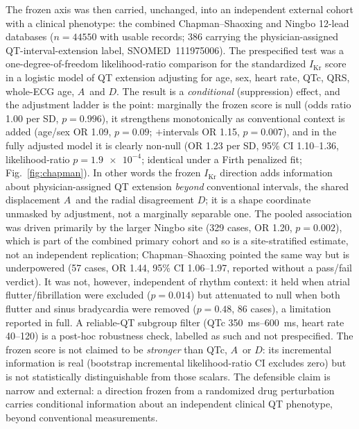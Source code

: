 \documentclass[11pt]{article}
\newcommand{\D}{\ensuremath{D}}
\newcommand{\A}{\ensuremath{A}}
\begin{document}
The frozen axis was then carried, unchanged, into an independent external cohort with a
clinical phenotype: the combined Chapman--Shaoxing and Ningbo 12-lead databases
($n=\num{44550}$ with usable records; \num{386} carrying the physician-assigned
QT-interval-extension label, SNOMED~111975006). The prespecified test was a
one-degree-of-freedom likelihood-ratio comparison for the standardized $I_{\text{Kr}}$ score
in a logistic model of QT extension adjusting for age, sex, heart rate, QTc, QRS, whole-ECG
age, \A\ and \D. The result is a \emph{conditional} (suppression) effect, and the adjustment
ladder is the point: marginally the frozen score is null (odds ratio \num{1.00} per SD,
$p=\num{0.996}$), it strengthens monotonically as conventional context is added
(age/sex OR \num{1.09}, $p=\num{0.09}$; $+$intervals OR \num{1.15}, $p=\num{0.007}$), and in
the fully adjusted model it is clearly non-null (OR \num{1.23} per SD, 95\% CI
\numrange{1.10}{1.36}, likelihood-ratio $p=\num{1.9e-4}$; identical under a Firth
penalized fit; Fig.~\ref{fig:chapman}). In other words the frozen $I_{\text{Kr}}$ direction adds information about
physician-assigned QT extension \emph{beyond} conventional intervals, the shared displacement
\A\ and the radial disagreement \D; it is a shape coordinate unmasked by adjustment, not a
marginally separable one. The pooled association was driven primarily by the larger Ningbo site
(\num{329} cases, OR \num{1.20}, $p=\num{0.002}$), which is part of the combined primary cohort and
so is a site-stratified estimate, not an independent replication; Chapman--Shaoxing pointed the same way but
is underpowered (\num{57} cases, OR \num{1.44}, 95\% CI \numrange{1.06}{1.97}, reported without
a pass/fail verdict). It was not, however, independent of rhythm context: it held when atrial
flutter/fibrillation were excluded ($p=\num{0.014}$) but attenuated to null when both flutter
and sinus bradycardia were removed ($p=\num{0.48}$, \num{86} cases), a limitation reported in
full. A reliable-QT subgroup filter (QTc \SIrange{350}{600}{\milli\second}, heart rate
\SIrange{40}{120}{}) is a post-hoc robustness check, labelled as such and not
prespecified. The frozen score is not claimed to be \emph{stronger} than QTc, \A\ or \D:
its incremental information is real (bootstrap incremental likelihood-ratio CI excludes zero)
but is not statistically distinguishable from those scalars. The defensible claim is narrow
and external: a direction frozen from a randomized drug perturbation carries conditional
information about an independent clinical QT phenotype, beyond conventional measurements.
\end{document}
